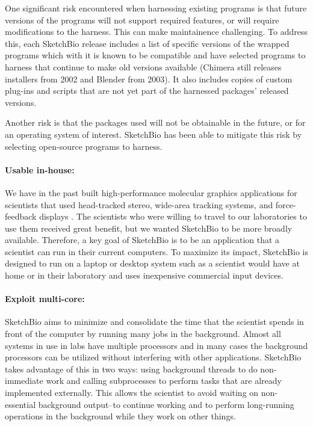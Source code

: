 \documentclass[twocolumn]{bmcart}%
\begin{document}
One significant risk encountered when harnessing existing programs is that future versions of the programs will not support required features, or will require modifications to the harness.
This can make maintainence challenging.
To address this, each SketchBio release includes a list of specific versions of the wrapped programs which with it is known to be compatible and have selected programs to harness that continue to make old versions available (Chimera still releases installers from 2002 and Blender from 2003). It also includes copies of custom plug-ins and scripts that are not yet part of the harnessed packages' released versions.

Another risk is that the packages used will not be obtainable in the future, or for an operating system of interest. SketchBio has been able to mitigate this risk by selecting open-source programs to harness.

\paragraph*{Usable in-house:} We have in the past built high-performance molecular graphics applications for scientists that used head-tracked stereo, wide-area tracking systems, and force-feedback displays \cite{Arthur,Grant1998,Marshburn2005,Taylor1999,Taylor1997,Taylor1993}.
The scientists who were willing to travel to our laboratories to use them received great benefit, but we wanted SketchBio to be more broadly available.
Therefore, a key goal of SketchBio is to be an application that a scientist can run in their current computers.
To maximize its impact, SketchBio is designed to run on a laptop or desktop system such as a scientist would have at home or in their laboratory and uses inexpensive commercial input devices.

\paragraph*{Exploit multi-core:} SketchBio aims to minimize and consolidate the time that the scientist spends in front of the computer by running many jobs in the background.
Almost all systems in use in labs have multiple processors and in many cases the background processors can be utilized without interfering with other applications.
SketchBio takes advantage of this in two ways: using background threads to do non-immediate work and calling subprocesses to perform tasks that are already implemented externally.
This allows the scientist to avoid waiting on non-essential background output--to continue working and to perform long-running operations in the background while they work on other things.
\end{document}
